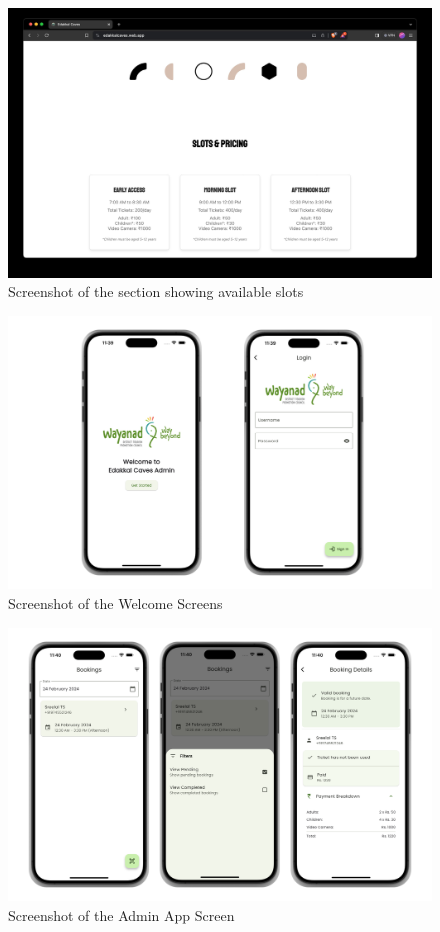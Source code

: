 \documentclass[12pt,a4paper]{report}
\begin{document}
\begin{figure}[htbp]
    \centering
    \includegraphics[width=1\textwidth]{screenshots/Slots.jpg}
    \caption{Screenshot of the section showing available slots}
\end{figure}

\begin{figure}[htbp]
    \centering
    \includegraphics[width=1\textwidth]{screenshots/welcome-screens.png}
    \caption{Screenshot of the Welcome Screens}
\end{figure}

\begin{figure}[htbp]
    \centering
    \includegraphics[width=1\textwidth]{screenshots/admin-app-screens.png}
    \caption{Screenshot of the Admin App Screen}
\end{figure}
\end{document}
